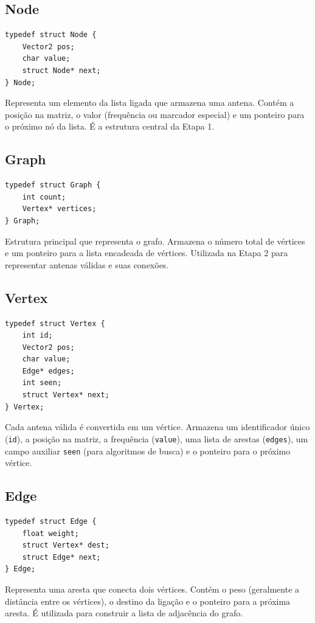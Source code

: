 \documentclass[a4paper,12pt]{article}
\begin{document}
\subsection{Node}
\begin{lstlisting}[style=CStyle]
typedef struct Node {
    Vector2 pos;
    char value;
    struct Node* next;
} Node;
\end{lstlisting}
Representa um elemento da lista ligada que armazena uma antena. Contém a posição na matriz, o valor (frequência ou marcador especial) e um ponteiro para o próximo nó da lista. É a estrutura central da Etapa 1.

\subsection{Graph}
\begin{lstlisting}[style=CStyle]
typedef struct Graph {
    int count;
    Vertex* vertices;
} Graph;
\end{lstlisting}
Estrutura principal que representa o grafo. Armazena o número total de vértices e um ponteiro para a lista encadeada de vértices. Utilizada na Etapa 2 para representar antenas válidas e suas conexões.

\subsection{Vertex}
\begin{lstlisting}[style=CStyle]
typedef struct Vertex {
    int id;
    Vector2 pos;
    char value;
    Edge* edges;
    int seen;
    struct Vertex* next;
} Vertex;
\end{lstlisting}
Cada antena válida é convertida em um vértice. Armazena um identificador único (\texttt{id}), a posição na matriz, a frequência (\texttt{value}), uma lista de arestas (\texttt{edges}), um campo auxiliar \texttt{seen} (para algoritmos de busca) e o ponteiro para o próximo vértice.

\subsection{Edge}
\begin{lstlisting}[style=CStyle]
typedef struct Edge {
    float weight;
    struct Vertex* dest;
    struct Edge* next;
} Edge;
\end{lstlisting}
Representa uma aresta que conecta dois vértices. Contém o peso (geralmente a distância entre os vértices), o destino da ligação e o ponteiro para a próxima aresta. É utilizada para construir a lista de adjacência do grafo.
\end{document}
